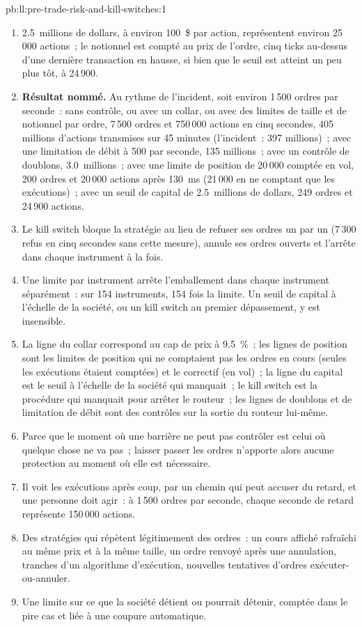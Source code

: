 \begin{solution}{pb:ll:pre-trade-risk-and-kill-switches:1}
\begin{enumerate}
avait pris du retard en fort volume).
\item 2.5~millions de dollars, à environ 100~\$ par action, représentent environ 25\,000 actions~; le notionnel est compté au prix de l'ordre, cinq ticks
au-dessus d'une dernière transaction en hausse, si bien que le seuil est atteint un peu plus tôt, à 24\,900.
\item \textbf{Résultat nommé.} Au rythme de l'incident, soit environ 1\,500 ordres par seconde~: sans contrôle, ou avec un collar, ou avec des limites de taille et
de notionnel par ordre, 7\,500 ordres et 750\,000 actions en cinq secondes, 405 millions d'actions transmises sur 45 minutes (l'incident~: 397 millions)~; avec une
limitation de débit à 500 par seconde, 135 millions~; avec un contrôle de doublons, 3.0~millions~; avec une limite de position
de 20\,000 comptée en vol, 200 ordres et 20\,000 actions après \qty{130}{\milli\second} (21\,000 en ne comptant que les exécutions)~; avec un
seuil de capital de 2.5~millions de dollars, 249 ordres et 24\,900 actions.
\item Le kill switch bloque la stratégie au lieu de refuser ses ordres un par un (7\,300 refus en cinq secondes sans cette mesure), annule
ses ordres ouverts et l'arrête dans chaque instrument à la fois.
\item Une limite par instrument arrête l'emballement dans chaque instrument séparément~: sur 154 instruments, 154 fois la limite. Un
seuil de capital à l'échelle de la société, ou un kill switch au premier dépassement, y est insensible.
\item La ligne du collar correspond au cap de prix à 9.5~\%~; les lignes de position sont les limites de position qui ne comptaient pas les ordres
en cours (seules les exécutions étaient comptées) et le correctif (en vol)~; la ligne du capital est le seuil à l'échelle de la société qui manquait~; le kill switch est la procédure qui manquait pour
arrêter le routeur~; les lignes de doublons et de limitation de débit sont des contrôles sur la sortie du routeur lui-même.
\item Parce que le moment où une barrière ne peut pas contrôler est celui où quelque chose ne va pas~; laisser passer les ordres n'apporte alors aucune protection au moment où
elle est nécessaire.
\item Il voit les exécutions après coup, par un chemin qui peut accuser du retard, et une personne doit agir~: à 1\,500 ordres par
seconde, chaque seconde de retard représente 150\,000 actions.
\item Des stratégies qui répètent légitimement des ordres~: un cours affiché rafraîchi au même prix et à la même taille, un ordre renvoyé après une
annulation, tranches d'un algorithme d'exécution, nouvelles tentatives d'ordres exécuter-ou-annuler.
\item Une limite sur ce que la société détient ou pourrait détenir, comptée dans le pire cas et liée à une coupure automatique.
\end{enumerate}
\end{solution}

